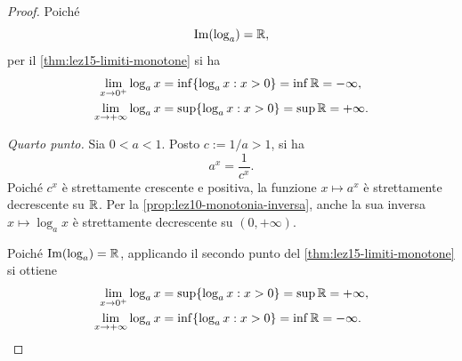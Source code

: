 \begin{proof}
Poiché
\[
  \operatorname{Im}(\log_a)=\mathbb{R},
\]
per il \cref{thm:lez15-limiti-monotone} si ha
\[
\begin{aligned}
  \lim_{x\to0^+}\log_a x
    &=\inf\{\log_a x:x>0\}
      =\inf\mathbb{R}=-\infty,\\
  \lim_{x\to+\infty}\log_a x
    &=\sup\{\log_a x:x>0\}
      =\sup\mathbb{R}=+\infty.
\end{aligned}
\]

\emph{Quarto punto.}
Sia \(0<a<1\). Posto \(c:=1/a>1\), si ha
\[
  a^x=\frac1{c^x}.
\]
Poiché \(c^x\) è strettamente crescente e positiva,
la funzione \(x\longmapsto a^x\) è strettamente
decrescente su \(\mathbb{R}\). Per la
\cref{prop:lez10-monotonia-inversa}, anche la sua
inversa \(x\longmapsto\log_a x\) è strettamente
decrescente su \((0,+\infty)\).

Poiché \(\operatorname{Im}(\log_a)=\mathbb{R}\), applicando
il secondo punto del \cref{thm:lez15-limiti-monotone}
si ottiene
\[
\begin{aligned}
  \lim_{x\to0^+}\log_a x
    &=\sup\{\log_a x:x>0\}
      =\sup\mathbb{R}=+\infty,\\
  \lim_{x\to+\infty}\log_a x
    &=\inf\{\log_a x:x>0\}
      =\inf\mathbb{R}=-\infty.
\end{aligned}
\]
\end{proof}
